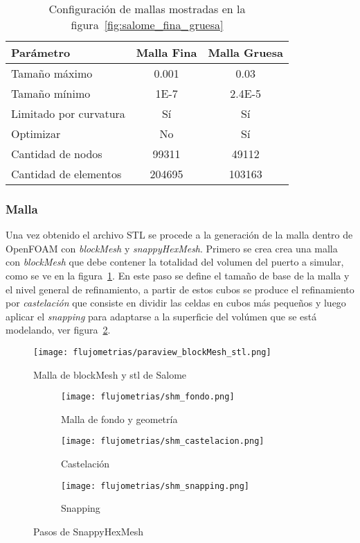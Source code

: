 \begin{table}
    \centering
    \begin{tabular}{lcc} \toprule
        Parámetro                & Malla Fina    & Malla Gruesa \\ \midrule
        Tamaño máximo            & 0.001         & 0.03 \\
        Tamaño mínimo            & 1E-7          & 2.4E-5 \\
        Limitado por curvatura   & Sí            & Sí \\
        Optimizar                & No            & Sí \\
        Cantidad de nodos        & 99311         & 49112 \\
        Cantidad de elementos    & 204695        & 103163 \\ \bottomrule
    \end{tabular}
    \caption{Configuración de mallas mostradas en la figura~\ref{fig:salome_fina_gruesa}}
    \label{tab:salome_fina_gruesa}
\end{table}

\subsubsection{Malla}
%
Una vez obtenido el archivo STL se procede a la generación de la malla dentro de
OpenFOAM con \emph{blockMesh} y \emph{snappyHexMesh}.
%
Primero se crea crea una malla con \emph{blockMesh} que  debe contener la
totalidad del volumen del puerto a simular, como se ve en la
figura~\ref{fig:paraview_blockMesh_stl}.
%
En este paso se define el tamaño de base de la malla y el nivel general de
refinamiento, a partir de estos cubos se produce el refinamiento por
\emph{castelación} que consiste en dividir las celdas en cubos más pequeños y luego
aplicar el \emph{snapping} para adaptarse a la superficie del volúmen que se está
modelando, ver figura~\ref{fig:openfoam_shm_pasos}.
%

\begin{figure}
    \centering
    \texttt{[image: flujometrias/paraview\_blockMesh\_stl.png]}
    \caption{Malla de blockMesh y stl de Salome}\label{fig:paraview_blockMesh_stl}
\end{figure}

\begin{figure}[t!]
    \centering
    \begin{subfigure}[t]{0.5\textwidth}
        \centering
        \texttt{[image: flujometrias/shm\_fondo.png]}
        \caption{Malla de fondo y geometría}
    \end{subfigure}%
    \begin{subfigure}[t]{0.5\textwidth}
        \centering
        \texttt{[image: flujometrias/shm\_castelacion.png]}
        \caption{Castelación}
    \end{subfigure}
    \begin{subfigure}[t]{0.5\textwidth}
        \centering
        \texttt{[image: flujometrias/shm\_snapping.png]}
        \caption{Snapping}
    \end{subfigure}
    \caption{Pasos de SnappyHexMesh\parencite{shm_steps}}\label{fig:openfoam_shm_pasos}
\end{figure}



